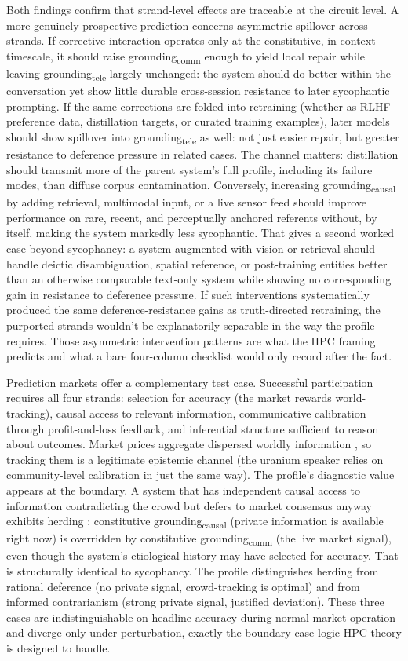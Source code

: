 \documentclass[12pt]{article}
\newcommand{\gtele}{grounding\textsubscript{tele}}
\newcommand{\gcausal}{grounding\textsubscript{causal}}
\newcommand{\gcomm}{grounding\textsubscript{comm}}
\begin{document}
Both findings confirm that strand-level effects are traceable at the circuit level. A more genuinely prospective prediction concerns asymmetric spillover across strands. If corrective interaction operates only at the constitutive, in-context timescale, it should raise \gcomm{} enough to yield local repair while leaving \gtele{} largely unchanged: the system should do better within the conversation yet show little durable cross-session resistance to later sycophantic prompting. If the same corrections are folded into retraining (whether as RLHF preference data, distillation targets, or curated training examples), later models should show spillover into \gtele{} as well: not just easier repair, but greater resistance to deference pressure in related cases. The channel matters: distillation should transmit more of the parent system's full profile, including its failure modes, than diffuse corpus contamination. Conversely, increasing \gcausal{} by adding retrieval, multimodal input, or a live sensor feed should improve performance on rare, recent, and perceptually anchored referents without, by itself, making the system markedly less sycophantic. That gives a second worked case beyond sycophancy: a system augmented with vision or retrieval should handle deictic disambiguation, spatial reference, or post-training entities better than an otherwise comparable text-only system while showing no corresponding gain in resistance to deference pressure. If such interventions systematically produced the same deference-resistance gains as truth-directed retraining, the purported strands wouldn't be explanatorily separable in the way the profile requires. Those asymmetric intervention patterns are what the HPC framing predicts and what a bare four-column checklist would only record after the fact.

Prediction markets offer a complementary test case. Successful participation requires all four strands: selection for accuracy (the market rewards world-tracking), causal access to relevant information, communicative calibration through profit-and-loss feedback, and inferential structure sufficient to reason about outcomes. Market prices aggregate dispersed worldly information \citep{hayek_1945_use_of_knowledge}, so tracking them is a legitimate epistemic channel (the uranium speaker relies on community-level calibration in just the same way). The profile's diagnostic value appears at the boundary. A system that has independent causal access to information contradicting the crowd but defers to market consensus anyway exhibits herding \citep{scharfstein_stein_1990_herd_behavior}: constitutive \gcausal{} (private information is available right now) is overridden by constitutive \gcomm{} (the live market signal), even though the system's etiological history may have selected for accuracy. That is structurally identical to sycophancy. The profile distinguishes herding from rational deference (no private signal, crowd-tracking is optimal) and from informed contrarianism (strong private signal, justified deviation). These three cases are indistinguishable on headline accuracy during normal market operation and diverge only under perturbation, exactly the boundary-case logic HPC theory is designed to handle.
\end{document}
